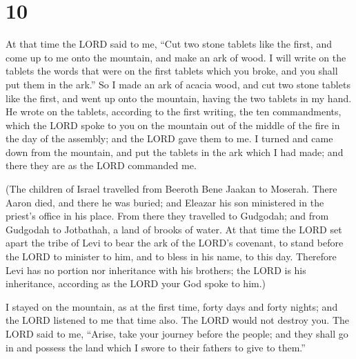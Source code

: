 \hypertarget{section-9}{%
\section{10}\label{section-9}}

 At that time the LORD said to me, ``Cut two stone tablets
like the first, and come up to me onto the mountain, and make an ark of
wood.  I will write on the tablets the words that were on
the first tablets which you broke, and you shall put them in the ark.''
 So I made an ark of acacia wood, and cut two stone tablets
like the first, and went up onto the mountain, having the two tablets in
my hand.  He wrote on the tablets, according to the first
writing, the ten commandments, which the LORD spoke to you on the
mountain out of the middle of the fire in the day of the assembly; and
the LORD gave them to me.  I turned and came down from the
mountain, and put the tablets in the ark which I had made; and there
they are as the LORD commanded me.

 (The children of Israel travelled from Beeroth Bene Jaakan
to Moserah. There Aaron died, and there he was buried; and Eleazar his
son ministered in the priest's office in his place.  From
there they travelled to Gudgodah; and from Gudgodah to Jotbathah, a land
of brooks of water.  At that time the LORD set apart the
tribe of Levi to bear the ark of the LORD's covenant, to stand before
the LORD to minister to him, and to bless in his name, to this day.
 Therefore Levi has no portion nor inheritance with his
brothers; the LORD is his inheritance, according as the LORD your God
spoke to him.)

 I stayed on the mountain, as at the first time, forty days
and forty nights; and the LORD listened to me that time also. The LORD
would not destroy you.  The LORD said to me, ``Arise, take
your journey before the people; and they shall go in and possess the
land which I swore to their fathers to give to them.''

